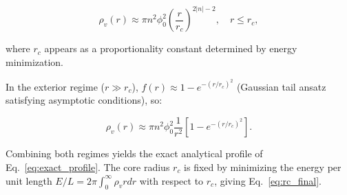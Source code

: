 \documentclass[11pt,a4paper]{article}
\begin{document}
\[
\rho_v(r) \approx \pi n^2 \phi_0^2 \left( \frac{r}{r_c} \right)^{2|n|-2}, \quad r \leq r_c,
\]

where $r_c$ appears as a proportionality constant determined by energy minimization.

In the exterior regime ($r \gg r_c$), $f(r) \approx 1 - e^{-(r/r_c)^2}$ (Gaussian tail ansatz satisfying asymptotic conditions), so:

\[
\rho_v(r) \approx \pi n^2 \phi_0^2 \frac{1}{r^2} \left[1 - e^{-(r/r_c)^2}\right].
\]

Combining both regimes yields the exact analytical profile of Eq.~\eqref{eq:exact_profile}. The core radius $r_c$ is fixed by minimizing the energy per unit length $ E/L = 2\pi \int_0^\infty \rho_v r dr $ with respect to $r_c$, giving Eq.~\eqref{eq:rc_final}.

\printbibliography
\end{document}
